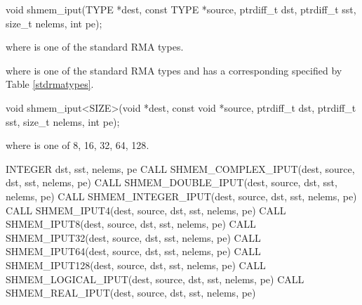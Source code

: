 
\begin{apidefinition}

\begin{C11synopsis}
void shmem_iput(TYPE *dest, const TYPE *source, ptrdiff_t dst, ptrdiff_t sst, size_t nelems, int pe);
\end{C11synopsis}
where \TYPE{} is one of the standard \ac{RMA} types.

\begin{Csynopsis}
\end{Csynopsis}
where \TYPE{} is one of the standard \ac{RMA} types and has a corresponding \TYPENAME{} specified by Table \ref{stdrmatypes}.

\begin{CsynopsisCol}
void shmem_iput<SIZE>(void *dest, const void *source, ptrdiff_t dst, ptrdiff_t sst, size_t nelems, int pe);
\end{CsynopsisCol}
where \SIZE{} is one of {8, 16, 32, 64, 128}.


\begin{Fsynopsis}
INTEGER dst, sst, nelems, pe
CALL SHMEM_COMPLEX_IPUT(dest, source, dst, sst, nelems, pe)
CALL SHMEM_DOUBLE_IPUT(dest, source, dst, sst, nelems, pe)
CALL SHMEM_INTEGER_IPUT(dest, source, dst, sst, nelems, pe)
CALL SHMEM_IPUT4(dest, source, dst, sst, nelems, pe)
CALL SHMEM_IPUT8(dest, source, dst, sst, nelems, pe)
CALL SHMEM_IPUT32(dest, source, dst, sst, nelems, pe)
CALL SHMEM_IPUT64(dest, source, dst, sst, nelems, pe)
CALL SHMEM_IPUT128(dest, source, dst, sst, nelems, pe)
CALL SHMEM_LOGICAL_IPUT(dest, source, dst, sst, nelems, pe)
CALL SHMEM_REAL_IPUT(dest, source, dst, sst, nelems, pe)
\end{Fsynopsis}


\end{apidefinition}
